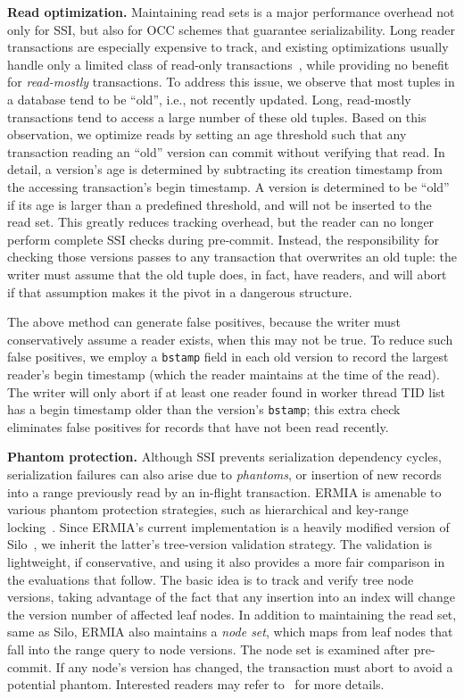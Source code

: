 {\bf Read optimization.}
Maintaining read sets is a major performance overhead not only for SSI, but also for OCC schemes that guarantee serializability. Long reader transactions are especially expensive to track, and existing optimizations usually handle only a limited class of read-only transactions~\cite{PortsG12}, while providing no benefit for \textit{read-mostly} transactions. To address this issue, we observe that most tuples in a database tend to be ``old'', i.e., not recently updated. Long, read-mostly transactions tend to access a large number of these old tuples. Based on this observation, we optimize reads by setting an age threshold such that any transaction reading an ``old'' version can commit without verifying that read. In detail, a version's age is determined by subtracting its creation timestamp from the accessing transaction's begin timestamp. A version is determined to be ``old'' if its age is larger than a predefined threshold, and will not be inserted to the read set. This greatly reduces tracking overhead, but the reader can no longer perform complete SSI checks during pre-commit. Instead, the responsibility for checking those versions passes to any transaction that overwrites an old tuple: the writer must assume that the old tuple does, in fact, have readers, and will abort if that assumption makes it the pivot in a dangerous structure. 

The above method can generate false positives, because the writer must conservatively assume a reader exists, when this may not be true. To reduce such false positives, we employ a \texttt{bstamp} field in each old version to record the largest reader's begin timestamp (which the reader maintains at the time of the read). The writer will only abort if at least one reader found in worker thread TID list has a begin timestamp older than the version's \texttt{bstamp}; this extra check eliminates false positives for records that have not been read recently.

{\bf Phantom protection.} Although SSI prevents serialization dependency cycles, serialization failures can also arise due to {\em phantoms}, or insertion of new records into a range previously read by an in-flight transaction. ERMIA is amenable to various phantom protection strategies, such as hierarchical and key-range locking~\cite{KimuraGK12,Lomet93}. Since ERMIA's current implementation
is a heavily modified version of Silo~\cite{TuZKLM13}, we inherit the latter's tree-version validation strategy. The validation is lightweight, if conservative, and using it also provides a more fair comparison in the evaluations that follow. The basic idea is to track and verify tree node versions, taking advantage of the fact that any insertion into an index will change the version number of affected leaf nodes. In addition to maintaining the read set, same as Silo, ERMIA also maintains a \textit{node set}, which maps from leaf nodes that fall into the range query to node versions. The node set is examined after pre-commit. If any node's version has changed, the transaction must abort to avoid a potential phantom. Interested readers may refer to~\cite{TuZKLM13} for more details.

